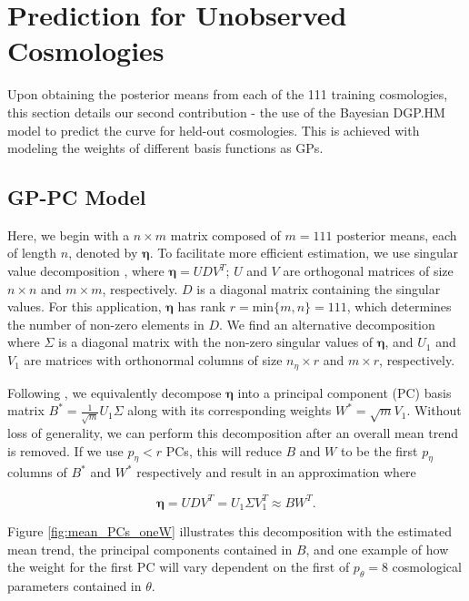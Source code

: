 \documentclass[11pt]{article}
\begin{document}
\section{Prediction for Unobserved Cosmologies}
\label{sec:pred}

Upon obtaining the posterior means from each of the 111 training cosmologies, this section details our second contribution - the use of the Bayesian DGP.HM model to predict the curve for held-out cosmologies. This is achieved with modeling the weights of different basis functions as GPs.

\subsection{GP-PC Model}
\label{subsec:pca}

Here, we begin with a $n \times m$ matrix composed of $m=111$ posterior means, each of length $n$, denoted by $\boldsymbol\eta$. To facilitate more efficient estimation, we use singular value decomposition \citep[SVD; e.g.,][]{banerjee2014linear}, where $\boldsymbol\eta = UDV^T$; $U$ and $V$ are orthogonal matrices of size $n \times n$ and  $m\times m$, respectively. $D$ is a diagonal matrix containing the singular values. For this application, $\boldsymbol\eta$ has rank $r=\text{min}\{m,n\}=111$, which determines the number of non-zero elements in $D$. We find an alternative decomposition where $\Sigma$ is a diagonal matrix with the non-zero singular values of $\boldsymbol\eta$, and $U_1$ and $V_1$ are matrices with orthonormal columns of size $n_\eta \times r$ and $m \times r$, respectively. 

Following \cite{higdon2008computer, higdon2010estcosmo}, we equivalently decompose $\boldsymbol\eta$ into a principal component (PC) basis matrix $B^* = \frac{1}{\sqrt{m}}U_1\Sigma$ along with its corresponding weights $W^* = \sqrt{m}V_1$. Without loss of generality, we can perform this decomposition after an overall mean trend is removed. If we use $p_\eta < r$ PCs, this will reduce $B$ and $W$ to be the first $p_\eta$ columns of $B^*$ and $W^*$ respectively and result in an approximation where 

\begin{equation}
    \boldsymbol\eta= UDV^T = U_1\Sigma V_1^T \approx BW^T.
\end{equation}

Figure \ref{fig:mean_PCs_oneW} illustrates this decomposition with the estimated mean trend, the principal components contained in $B$, and one example of how the weight for the first PC will vary dependent on the first of $p_\theta=8$ cosmological parameters contained in $\theta$.
\end{document}
